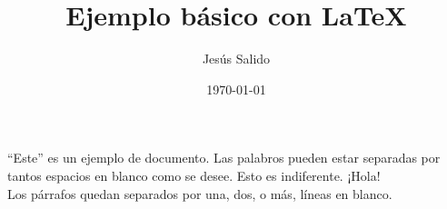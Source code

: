 \documentclass[11pt,a4paper]{article}
\title{Ejemplo básico con \LaTeX}
\author{Jesús Salido}
\date{\today}
\begin{document}
\maketitle


\noindent “Este” es un ejemplo de documento. Las     palabros        pueden estar       separadas por tantos         espacios     en blanco   como se desee. Esto es indiferente. ¡Hola! \\[2cm]





           Los párrafos quedan separados por una, dos, o más, líneas en blanco.
           
           
\end{document}
